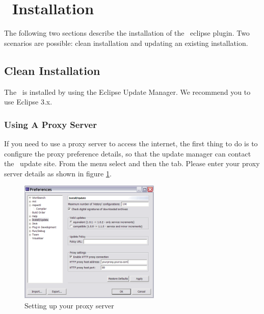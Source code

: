 \section{\cjdt ~Installation}
The following two sections describe the installation of the \caesarj ~eclipse plugin. Two scenarios are possible: clean installation and updating an existing installation.
\subsection{Clean Installation} 

The \cjdt ~is installed by using the Eclipse Update Manager. We recommend you to use Eclipse 3.x.
\subsubsection{Using A Proxy Server} 
If you need to use a proxy server to access the internet, the first thing
to do is to configure the proxy preference details, so that the update manager can contact the
\cjdt ~update site. From the  menu select  and then the
 tab. Please enter your proxy server details as shown in figure \ref{fig:proxy}.
\begin{figure}[htbp]
	\centering
		\includegraphics[width=0.60\textwidth]{./images/proxy.png}
	\caption{Setting up your proxy server}
	\label{fig:proxy}
\end{figure}

